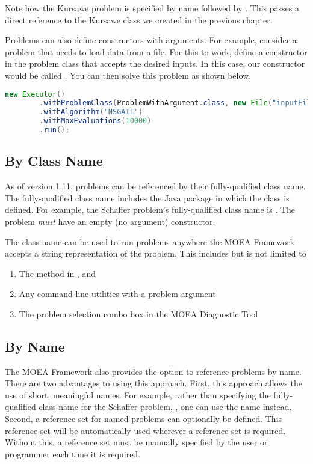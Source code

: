 Note how the Kursawe problem is specified by name followed by .  This passes a direct reference to the Kursawe class we created in the previous chapter.

Problems can also define constructors with arguments.  For example, consider a problem that needs to load data from a file.  For this to work, define a constructor in the problem class that accepts the desired inputs.  In this case, our constructor would be called .  You can then solve this problem as shown below.

\begin{lstlisting}[language=Java]
new Executor()
		.withProblemClass(ProblemWithArgument.class, new File("inputFile.txt"))
		.withAlgorithm("NSGAII")
		.withMaxEvaluations(10000)
		.run();
\end{lstlisting}

\subsection{By Class Name}
As of version 1.11, problems can be referenced by their fully-qualified class name.  The fully-qualified class name includes the Java package in which the class is defined.  For example, the Schaffer problem's fully-qualified class name is .  The problem \emph{must} have an empty (no argument) constructor.

The class name can be used to run problems anywhere the MOEA Framework accepts a string representation of the problem.  This includes but is not limited to
\begin{enumerate}
  \item The  method in ,  and 
  \item Any command line utilities with a problem argument
  \item The problem selection combo box in the MOEA Diagnostic Tool
\end{enumerate}

\subsection{By Name}

The MOEA Framework also provides the option to reference problems by name.  There are two advantages to using this approach.  First, this approach allows the use of short, meaningful names.  For example, rather than specifying the fully-qualified class name for the Schaffer problem, , one can use the name  instead.  Second, a reference set for named problems can optionally be defined.  This reference set will be automatically used wherever a reference set is required.  Without this, a reference set must be manually specified by the user or programmer each time it is required.

